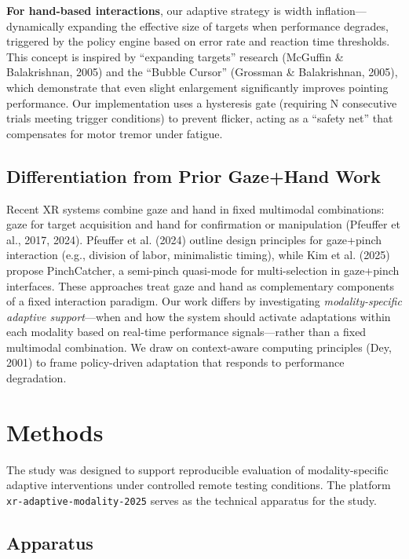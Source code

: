 \documentclass[
  11pt,
  11pt,
  letterpaper]{article}
\begin{document}
\textbf{For hand-based interactions}, our adaptive strategy is width
inflation---dynamically expanding the effective size of targets when
performance degrades, triggered by the policy engine based on error rate
and reaction time thresholds. This concept is inspired by ``expanding
targets'' research (McGuffin \& Balakrishnan, 2005) and the ``Bubble
Cursor'' (Grossman \& Balakrishnan, 2005), which demonstrate that even
slight enlargement significantly improves pointing performance. Our
implementation uses a hysteresis gate (requiring N consecutive trials
meeting trigger conditions) to prevent flicker, acting as a ``safety
net'' that compensates for motor tremor under fatigue.

\subsection{Differentiation from Prior Gaze+Hand
Work}\label{differentiation-from-prior-gazehand-work}

Recent XR systems combine gaze and hand in fixed multimodal
combinations: gaze for target acquisition and hand for confirmation or
manipulation (Pfeuffer et al., 2017, 2024). Pfeuffer et al. (2024)
outline design principles for gaze+pinch interaction (e.g., division of
labor, minimalistic timing), while Kim et al. (2025) propose
PinchCatcher, a semi-pinch quasi-mode for multi-selection in gaze+pinch
interfaces. These approaches treat gaze and hand as complementary
components of a fixed interaction paradigm. Our work differs by
investigating \emph{modality-specific adaptive support}---when and how
the system should activate adaptations within each modality based on
real-time performance signals---rather than a fixed multimodal
combination. We draw on context-aware computing principles (Dey, 2001)
to frame policy-driven adaptation that responds to performance
degradation.

\section{Methods}\label{methods}

The study was designed to support reproducible evaluation of
modality-specific adaptive interventions under controlled remote testing
conditions. The platform \texttt{xr-adaptive-modality-2025} serves as
the technical apparatus for the study.

\subsection{Apparatus}\label{apparatus}
\end{document}
